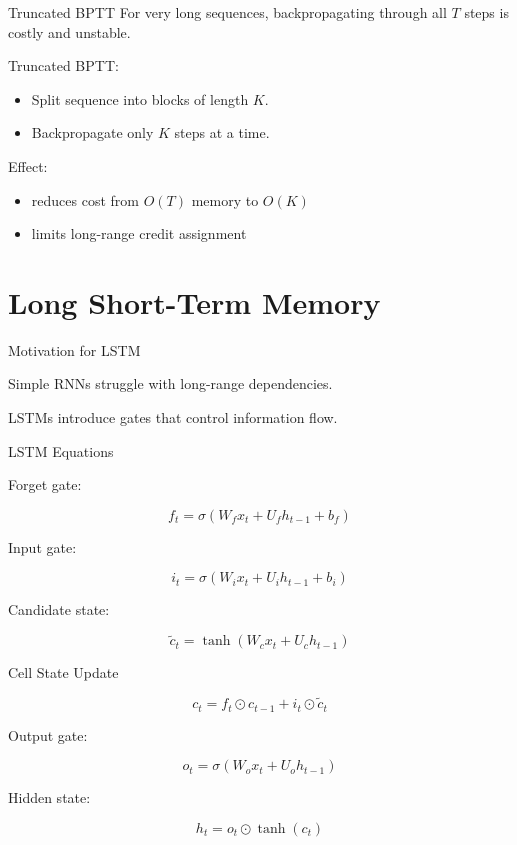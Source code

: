 \documentclass{beamer}
\begin{document}
\begin{frame}{Truncated BPTT}
  For very long sequences, backpropagating through all \(T\) steps is costly and unstable.

  Truncated BPTT:
  \begin{itemize}
  \item Split sequence into blocks of length \(K\).
  \item Backpropagate only \(K\) steps at a time.
  \end{itemize}

  Effect:
  \begin{itemize}
  \item reduces cost from \(O(T)\) memory to \(O(K)\)
  \item limits long-range credit assignment
  \end{itemize}
\end{frame}


\section{Long Short-Term Memory}

\begin{frame}{Motivation for LSTM}

Simple RNNs struggle with long-range dependencies.

LSTMs introduce gates that control information flow.
\end{frame}

\begin{frame}{LSTM Equations}

Forget gate:

\[
f_t = \sigma(W_f x_t + U_f h_{t-1} + b_f)
\]

Input gate:

\[
i_t = \sigma(W_i x_t + U_i h_{t-1} + b_i)
\]

Candidate state:

\[
\tilde c_t = \tanh(W_c x_t + U_c h_{t-1})
\]
\end{frame}

\begin{frame}{Cell State Update}

\[
c_t = f_t \odot c_{t-1} + i_t \odot \tilde c_t
\]

Output gate:

\[
o_t = \sigma(W_o x_t + U_o h_{t-1})
\]

Hidden state:

\[
h_t = o_t \odot \tanh(c_t)
\]
\end{frame}
\end{document}
